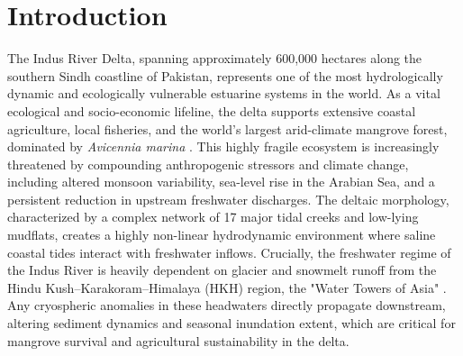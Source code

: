 \documentclass[preprint,12pt]{elsarticle}
\begin{document}
\section{Introduction}
The Indus River Delta, spanning approximately 600,000 hectares along the southern Sindh coastline of Pakistan, represents one of the most hydrologically dynamic and ecologically vulnerable estuarine systems in the world. As a vital ecological and socio-economic lifeline, the delta supports extensive coastal agriculture, local fisheries, and the world's largest arid-climate mangrove forest, dominated by \textit{Avicennia marina} \cite{haider_gridded_2025, nanditha_pakistan_2023, bazai_exploring_2025}. This highly fragile ecosystem is increasingly threatened by compounding anthropogenic stressors and climate change, including altered monsoon variability, sea-level rise in the Arabian Sea, and a persistent reduction in upstream freshwater discharges. The deltaic morphology, characterized by a complex network of 17 major tidal creeks and low-lying mudflats, creates a highly non-linear hydrodynamic environment where saline coastal tides interact with freshwater inflows. Crucially, the freshwater regime of the Indus River is heavily dependent on glacier and snowmelt runoff from the Hindu Kush--Karakoram--Himalaya (HKH) region, the "Water Towers of Asia" \cite{immerzeel_science_2010, lutz_consistent_2014, arshad_anthropogenic_2025}. Any cryospheric anomalies in these headwaters directly propagate downstream, altering sediment dynamics and seasonal inundation extent, which are critical for mangrove survival and agricultural sustainability in the delta.
\end{document}
